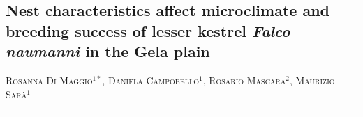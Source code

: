 \setcounter{figure}{0}
\setcounter{table}{0}

\begin{adjustwidth}{-3.5cm}{0cm}
\pagestyle{CIOpage}
\chapter*[Microclimate affects lesser kestrel breeding success in
Sicily]{Nest characteristics affect microclimate and breeding success of
lesser kestrel \textbf{\textit{Falco naumanni}}\textbf{ in the Gela
plain}}

\textsc{Rosanna Di Maggio}$^{1*}$, \textsc{Daniela Campobello}$^{1}$, 
\textsc{Rosario Mascara}$^{2}$, \textsc{Maurizio Sar\`a}$^{1}$ \\

   
\noindent\color{MUSEBLUE}\rule{27cm}{2pt}
\vspace{1cm}
\end{adjustwidth}



